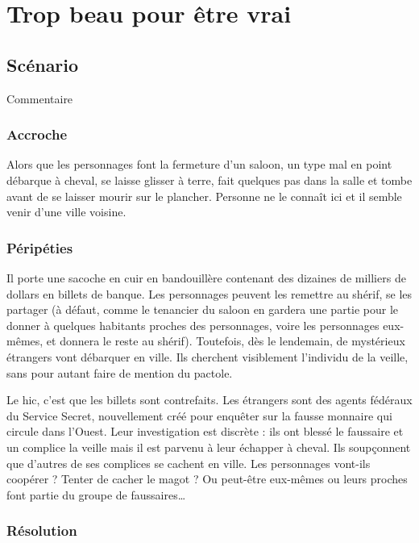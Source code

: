 \chapter{Trop beau pour être vrai}

\section{Scénario}

Commentaire

\subsection{Accroche}

Alors que les personnages font la fermeture d'un saloon, un type mal en point débarque à cheval, se laisse glisser à terre, fait quelques pas dans la salle et tombe avant de se laisser mourir sur le plancher. Personne ne le connaît ici et il semble venir d'une ville voisine.

\subsection{Péripéties}

Il porte une sacoche en cuir en bandouillère contenant des dizaines de milliers de dollars en billets de banque. Les personnages peuvent les remettre au shérif, se les partager (à défaut, comme le tenancier du saloon en gardera une partie pour le donner à quelques habitants proches des personnages, voire les personnages eux-mêmes, et donnera le reste au shérif). Toutefois, dès le lendemain, de mystérieux étrangers vont débarquer en ville. Ils cherchent visiblement l'individu de la veille, sans pour autant faire de mention du pactole.

Le hic, c'est que les billets sont contrefaits. Les étrangers sont des agents fédéraux du Service Secret, nouvellement créé pour enquêter sur la fausse monnaire qui circule dans l'Ouest. Leur investigation est discrète : ils ont blessé le faussaire et un complice la veille mais il est parvenu à leur échapper à cheval. Ils soupçonnent que d'autres de ses complices se cachent en ville. Les personnages vont-ils coopérer ? Tenter de cacher le magot ? Ou peut-être eux-mêmes ou leurs proches font partie du groupe de faussaires…

\subsection{Résolution}

